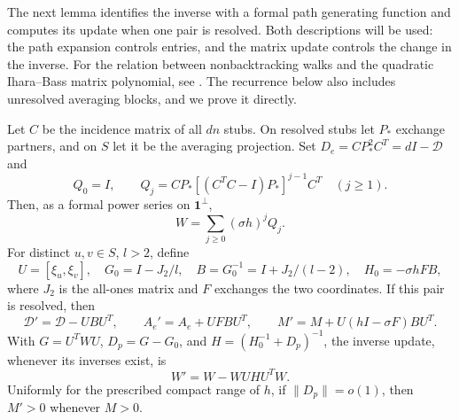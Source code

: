The next lemma identifies the inverse with a formal path generating
function and computes its update when one pair is resolved. Both
descriptions will be used: the path expansion controls entries, and the
matrix update controls the change in the inverse.
For the relation between nonbacktracking walks and the quadratic
Ihara--Bass matrix polynomial, see
\cite[Section~6, Eq.~(6.2)]{FZ1999}. The recurrence below
also includes unresolved averaging blocks, and we prove it directly.

\begin{lemma}
\label{lemma:configuration-algebra}
Let $C$ be the incidence matrix of all $dn$ stubs. On resolved stubs let
$P_*$ exchange partners, and on $S$ let it be the averaging projection.
Set $D_e=CP_*^2C^T=dI-\mathcal D$ and
\[
 Q_0=I,\qquad
 Q_j=CP_*[(C^TC-I)P_*]^{j-1}C^T\quad(j\ge1).
\]
Then, as a formal power series on $\mathbf 1^\perp$,
\[
 W=\sum_{j\ge0}(\sigma h)^jQ_j.
\]
For distinct $u,v\in S$, $l>2$, define
\[
 U=[\xi_u,\xi_v],\quad
 G_0=I-J_2/l,\quad B=G_0^{-1}=I+J_2/(l-2),\quad
 H_0=-\sigma h FB,
\]
where $J_2$ is the all-ones matrix and $F$ exchanges the two coordinates.
If this pair is resolved, then
\[
 \mathcal D'=\mathcal D-UBU^T,\qquad
 A_e'=A_e+UFBU^T,\qquad
 M'=M+U(hI-\sigma F)BU^T.
\]
With $G=U^TWU$, $D_p=G-G_0$, and
$H=(H_0^{-1}+D_p)^{-1}$, the inverse update, whenever its inverses
exist, is
\[
 W'=W-WUHU^TW.
\]
Uniformly for the prescribed compact range of $h$, if $\|D_p\|=o(1)$,
then $M'>0$ whenever $M>0$.
\end{lemma}

